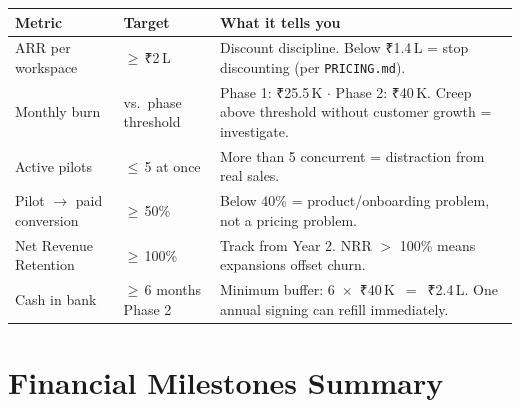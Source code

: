 \documentclass[12pt,a4paper]{article}
\begin{document}
\begin{tabular}{@{}L{4cm}L{3.5cm}L{7.5cm}@{}}
  \toprule
  \textbf{Metric} & \textbf{Target} & \textbf{What it tells you} \\
  \midrule
  ARR per workspace
    & $\geq$\,₹2\,L
    & Discount discipline. Below ₹1.4\,L = stop discounting (per \texttt{PRICING.md}). \\[0.4em]
  Monthly burn
    & vs.\ phase threshold
    & Phase 1: ₹25.5\,K $\cdot$ Phase 2: ₹40\,K. Creep above threshold without customer growth = investigate. \\[0.4em]
  Active pilots
    & $\leq$\,5 at once
    & More than 5 concurrent = distraction from real sales. \\[0.4em]
  Pilot $\to$ paid conversion
    & $\geq$\,50\%
    & Below 40\% = product/onboarding problem, not a pricing problem. \\[0.4em]
  Net Revenue Retention
    & $\geq$\,100\%
    & Track from Year 2. NRR $>$ 100\% means expansions offset churn. \\[0.4em]
  Cash in bank
    & $\geq$\,6 months Phase 2
    & Minimum buffer: 6~$\times$~₹40\,K~$=$~₹2.4\,L. One annual signing can refill immediately. \\
  \bottomrule
\end{tabular}

\section{Financial Milestones Summary}
\end{document}
